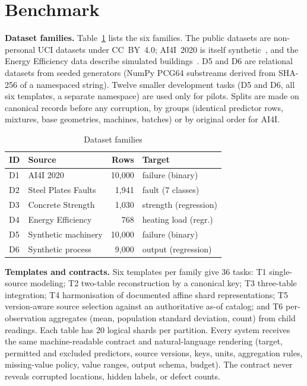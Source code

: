 \documentclass[conference]{IEEEtran}
\begin{document}
\section{Benchmark}
\label{sec:bench}
\textbf{Dataset families.} Table~\ref{tab:data} lists the six families. The public datasets are non-personal UCI
datasets under CC~BY~4.0; AI4I~2020 is itself synthetic~\cite{matzka2020ai4i}, and the Energy Efficiency data
describe simulated buildings~\cite{tsanas2012energy}. D5 and D6 are relational datasets from seeded generators
(NumPy PCG64 substreams derived from SHA-256 of a namespaced string). Twelve smaller development tasks (D5 and D6,
all six templates, a separate namespace) are used only for pilots. Splits are made on canonical records before any
corruption, by groups (identical predictor rows, mixtures, base geometries, machines, batches) or by original order
for AI4I.

\begin{table}[t]
\caption{Dataset families}
\label{tab:data}
\centering\footnotesize\setlength{\tabcolsep}{4pt}
\begin{tabular}{@{}llrl@{}}
\toprule
ID & Source & Rows & Target \\
\midrule
D1 & AI4I 2020~\cite{uci601ai4i} & 10,000 & failure (binary) \\
D2 & Steel Plates Faults~\cite{uci198steel} & 1,941 & fault (7 classes) \\
D3 & Concrete Strength~\cite{uci165concrete,yeh1998concrete} & 1,030 & strength (regression) \\
D4 & Energy Efficiency~\cite{uci242energy} & 768 & heating load (regr.) \\
D5 & Synthetic machinery & 10,000 & failure (binary) \\
D6 & Synthetic process & 9,000 & output (regression) \\
\bottomrule
\end{tabular}
\end{table}

\textbf{Templates and contracts.} Six templates per family give 36 tasks: T1 single-source modeling; T2 two-table
reconstruction by a canonical key; T3 three-table integration; T4 harmonisation of documented affine shard
representations; T5 version-aware source selection against an authoritative as-of catalog; and T6 per-observation
aggregates (mean, population standard deviation, count) from child readings. Each table has 20 logical shards per
partition. Every system receives the same machine-readable contract and natural-language rendering (target,
permitted and excluded predictors, source versions, keys, units, aggregation rules, missing-value policy, value
ranges, output schema, budget). The contract never reveals corrupted locations, hidden labels, or defect counts.
\end{document}
